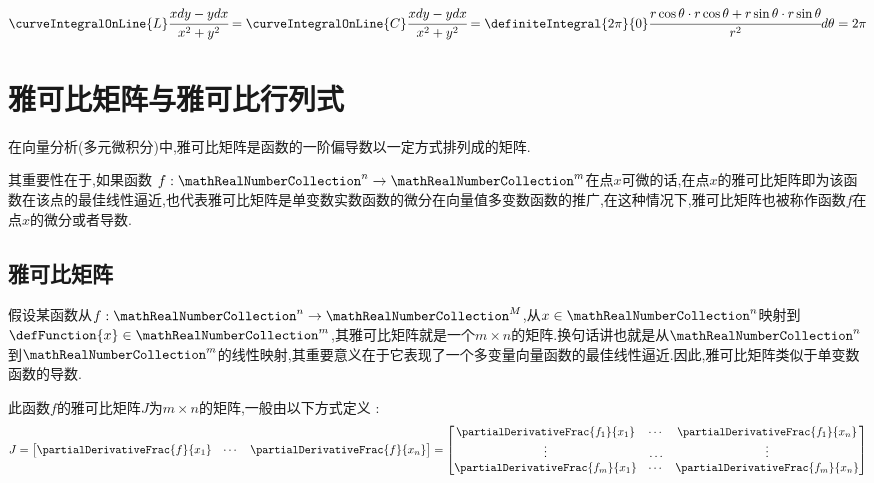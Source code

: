 {{{\begin{enumerate}
{\begin{enumerate}
{\begin{enumerate}
{                              $$
                                \curveIntegralOnLine{L}\cfrac{xdy - ydx}{x^2 + y^2} = \curveIntegralOnLine{C}\cfrac{xdy - ydx}{x^2 + y^2} = \definiteIntegral{2\pi}{0}\cfrac{r\cos\theta \cdot r\cos\theta + r\sin\theta \cdot r\sin\theta}{r^2}d\theta = 2\pi
                              $$
                              }
                      \end{enumerate}
                      }
              \end{enumerate}
              }
      \end{enumerate}
    }%

  }%

  \section{雅可比矩阵与雅可比行列式}{
    在向量分析(多元微积分)中,雅可比矩阵是函数的一阶偏导数以一定方式排列成的矩阵.

    其重要性在于,如果函数 $f:\mathRealNumberCollection^n \to \mathRealNumberCollection^m$在点$x$可微的话,在点$x$的雅可比矩阵即为该函数在该点的最佳线性逼近,也代表雅可比矩阵是单变数实数函数的微分在向量值多变数函数的推广,在这种情况下,雅可比矩阵也被称作函数$f$在点$x$的微分或者导数.

    \subsection{雅可比矩阵}{
      假设某函数从$f : \mathRealNumberCollection^n \to \mathRealNumberCollection^M$,从$x\in\mathRealNumberCollection^n$映射到$\defFunction{x}\in\mathRealNumberCollection^m$,其雅可比矩阵就是一个$m \times n$的矩阵.换句话讲也就是从$\mathRealNumberCollection^n$到$\mathRealNumberCollection^m$的线性映射,其重要意义在于它表现了一个多变量向量函数的最佳线性逼近.因此,雅可比矩阵类似于单变数函数的导数.

      此函数$f$的雅可比矩阵$J$为$m \times n$的矩阵,一般由以下方式定义 :
      $$
        J =
        \begin{bmatrix}
          \partialDerivativeFrac{f}{x_1} & \dotsm & \partialDerivativeFrac{f}{x_n}
        \end{bmatrix}
        =
        \begin{bmatrix}
          \partialDerivativeFrac{f_1}{x_1} & \dotsm & \partialDerivativeFrac{f_1}{x_n} \\
          \vdots                           & \ldots & \vdots                           \\
          \partialDerivativeFrac{f_m}{x_1} & \dotsm & \partialDerivativeFrac{f_m}{x_n}
        \end{bmatrix}
      $$

}}}
